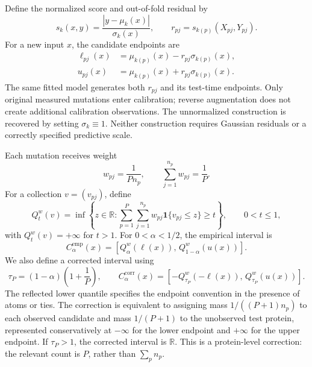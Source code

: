 \documentclass[11pt]{article}
\begin{document}
Define the normalized score and out-of-fold residual by
\begin{equation}
 s_k(x,y)=\frac{|y-\mu_k(x)|}{\sigma_k(x)},
 \qquad r_{pj}=s_{k(p)}(X_{pj},Y_{pj}).
 \label{eq:normalized-protein-scores}
\end{equation}
For a new input $x$, the candidate endpoints are
\begin{align}
 \ell_{pj}(x)&=\mu_{k(p)}(x)-r_{pj}\sigma_{k(p)}(x),\nonumber\\
 u_{pj}(x)&=\mu_{k(p)}(x)+r_{pj}\sigma_{k(p)}(x).
 \label{eq:protein-candidates}
\end{align}
The same fitted model generates both $r_{pj}$ and its test-time endpoints. Only original measured mutations enter calibration; reverse augmentation does not create additional calibration observations. The unnormalized construction is recovered by setting $\sigma_k\equiv1$. Neither construction requires Gaussian residuals or a correctly specified predictive scale.

Each mutation receives weight
\begin{equation}
 w_{pj}=\frac1{Pn_p},\qquad
 \sum_{j=1}^{n_p}w_{pj}=\frac1P.
 \label{eq:protein-calibration-weights}
\end{equation}
For a collection $v=(v_{pj})$, define
\begin{equation}
 Q_t^w(v)=\inf\left\{z\in\mathbb R:
     \sum_{p=1}^P\sum_{j=1}^{n_p}w_{pj}
     \mathbf1\{v_{pj}\leq z\}\geq t\right\},
 \qquad 0<t\leq1,
 \label{eq:weighted-endpoint-quantile}
\end{equation}
with $Q_t^w(v)=+\infty$ for $t>1$. For $0<\alpha<1/2$, the empirical interval is
\begin{equation}
 C_{\alpha}^{\mathrm{emp}}(x)
 =\left[Q_\alpha^w(\ell(x)),\,
         Q_{1-\alpha}^w(u(x))\right].
 \label{eq:empirical-protein-cvplus}
\end{equation}
We also define a corrected interval using
\begin{equation}
 \tau_P=(1-\alpha)\left(1+\frac1P\right),\qquad
 C_{\alpha}^{\mathrm{corr}}(x)
 =\left[-Q_{\tau_P}^w(-\ell(x)),\,
          Q_{\tau_P}^w(u(x))\right].
 \label{eq:corrected-protein-cvplus}
\end{equation}
The reflected lower quantile specifies the endpoint convention in the presence of atoms or ties. The correction is equivalent to assigning mass $1/((P+1)n_p)$ to each observed candidate and mass $1/(P+1)$ to the unobserved test protein, represented conservatively at $-\infty$ for the lower endpoint and $+\infty$ for the upper endpoint. If $\tau_P>1$, the corrected interval is $\mathbb R$. This is a protein-level correction: the relevant count is $P$, rather than $\sum_pn_p$.
\end{document}
